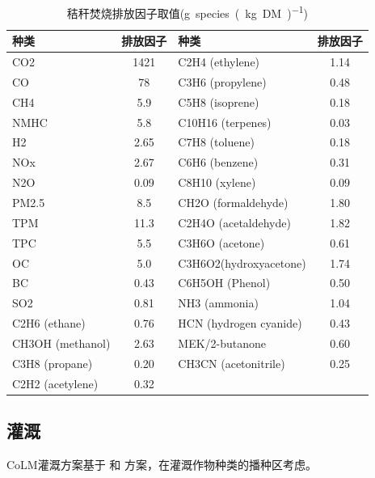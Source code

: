 \begin{table}[htbp]
  \centering
  \caption{秸秆焚烧排放因子取值(\unit{g.species.(kg.DM)^{-1}})}
  \label{tab:秸秆焚烧排放因子取值}
  \begin{tabular}{@{}lc|lc@{}}
  \toprule
  种类 & 排放因子 & 种类                     & 排放因子 \\ \midrule
  CO2                    & 1421 & C2H4   (ethylene)      & 1.14 \\
  CO                     & 78   & C3H6   (propylene)     & 0.48 \\
  CH4                    & 5.9  & C5H8   (isoprene)      & 0.18 \\
  NMHC                   & 5.8  & C10H16   (terpenes)    & 0.03 \\
  H2                     & 2.65 & C7H8   (toluene)       & 0.18 \\
  NOx                    & 2.67 & C6H6   (benzene)       & 0.31 \\
  N2O                    & 0.09 & C8H10   (xylene)       & 0.09 \\
  PM2.5                  & 8.5  & CH2O   (formaldehyde)  & 1.80 \\
  TPM                    & 11.3 & C2H4O   (acetaldehyde) & 1.82 \\
  TPC                    & 5.5  & C3H6O   (acetone)      & 0.61 \\
  OC                     & 5.0  & C3H6O2(hydroxyacetone) & 1.74 \\
  BC                     & 0.43 & C6H5OH   (Phenol)      & 0.50 \\
  SO2                    & 0.81 & NH3 (ammonia)          & 1.04 \\
  C2H6   (ethane)        & 0.76 & HCN (hydrogen cyanide) & 0.43 \\
  CH3OH   (methanol)     & 2.63 & MEK/2-butanone         & 0.60 \\
  C3H8   (propane)       & 0.20 & CH3CN   (acetonitrile) & 0.25 \\
  C2H2   (acetylene)     & 0.32 &                        &      \\ \bottomrule
  \end{tabular}
\end{table}


\subsection{灌溉}
CoLM灌溉方案基于\citet{ozdogan2010simulating} 和 \citet{yao2022Irrigation}方案，在灌溉作物种类的播种区考虑。

